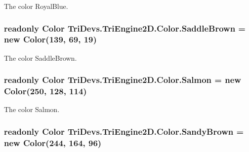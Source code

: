 The color Royal\-Blue. 

\hypertarget{struct_tri_devs_1_1_tri_engine2_d_1_1_color_a903eb967599d999e64e05b4965bbd753}{
\subsubsection[{Saddle\-Brown}]{\setlength{\rightskip}{0pt plus 5cm}readonly {\bf Color} Tri\-Devs.\-Tri\-Engine2\-D.\-Color.\-Saddle\-Brown = new {\bf Color}(139, 69, 19)\hspace{0.3cm}{\ttfamily [static]}}}\label{struct_tri_devs_1_1_tri_engine2_d_1_1_color_a903eb967599d999e64e05b4965bbd753}


The color Saddle\-Brown. 

\hypertarget{struct_tri_devs_1_1_tri_engine2_d_1_1_color_aa389cb8ba4594b39f43ac81826d2054d}{
\subsubsection[{Salmon}]{\setlength{\rightskip}{0pt plus 5cm}readonly {\bf Color} Tri\-Devs.\-Tri\-Engine2\-D.\-Color.\-Salmon = new {\bf Color}(250, 128, 114)\hspace{0.3cm}{\ttfamily [static]}}}\label{struct_tri_devs_1_1_tri_engine2_d_1_1_color_aa389cb8ba4594b39f43ac81826d2054d}


The color Salmon. 

\hypertarget{struct_tri_devs_1_1_tri_engine2_d_1_1_color_a2107692671cc4d4e1651bca03301c25f}{
\subsubsection[{Sandy\-Brown}]{\setlength{\rightskip}{0pt plus 5cm}readonly {\bf Color} Tri\-Devs.\-Tri\-Engine2\-D.\-Color.\-Sandy\-Brown = new {\bf Color}(244, 164, 96)\hspace{0.3cm}{\ttfamily [static]}}}\label{struct_tri_devs_1_1_tri_engine2_d_1_1_color_a2107692671cc4d4e1651bca03301c25f}


